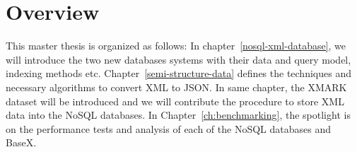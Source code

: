 		
	\section{Overview }
		This master thesis is organized as follows: In chapter~\ref{nosql-xml-database}, we will introduce the two new databases systems with their data and query model, indexing methods etc. Chapter~\ref{semi-structure-data} defines the techniques and necessary algorithms to convert XML  to JSON. In same chapter, the XMARK dataset will be introduced and we will contribute the procedure to store XML data into the NoSQL databases. In Chapter~\ref{ch:benchmarking}, the spotlight is on the performance tests and analysis of each of the NoSQL databases and BaseX.